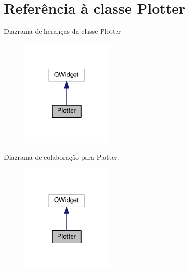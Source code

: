 \hypertarget{class_plotter}{}\section{Referência à classe Plotter}
\label{class_plotter}


Diagrama de heranças da classe Plotter\nopagebreak
\begin{figure}[H]
\begin{center}
\leavevmode
\includegraphics[width=135pt]{class_plotter__inherit__graph}
\end{center}
\end{figure}


Diagrama de colaboração para Plotter\+:\nopagebreak
\begin{figure}[H]
\begin{center}
\leavevmode
\includegraphics[width=135pt]{class_plotter__coll__graph}
\end{center}
\end{figure}
